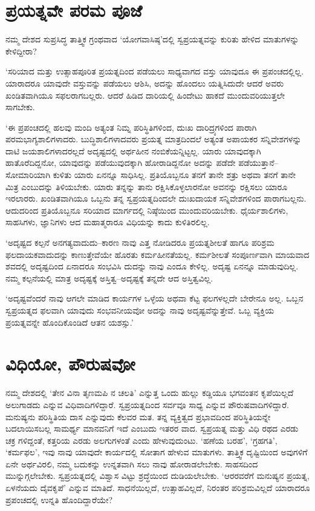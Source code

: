 \section*{ಪ್ರಯತ್ನವೇ ಪರಮ ಪೂಜೆ}


ನಮ್ಮ ದೇಶದ ಸುಪ್ರಸಿದ್ಧ ತಾತ್ತ್ವಿಕ ಗ್ರಂಥವಾದ ‘ಯೋಗವಾಸಿಷ್ಠ’ದಲ್ಲಿ ಸ್ವಪ್ರಯತ್ನವನ್ನು ಕುರಿತು ಹೇಳಿದ ಮಾತುಗಳನ್ನು ಕೇಳಿದ್ದೀರಾ?

‘ಸರಿಯಾದ ಮತ್ತು ಉತ್ಸಾಹಪೂರಿತ ಪ್ರಯತ್ನದಿಂದ ಪಡೆಯಲು ಸಾಧ್ಯವಾಗದ ವಸ್ತು ಯಾವುದೂ ಈ ಪ್ರಪಂಚದಲ್ಲಿಲ್ಲ. ಯಾರಾದರೂ ಯಾವುದೇ ವಸ್ತುವನ್ನು ಪಡೆಯಲು ಆಶಿಸಿ, ಅದನ್ನು ಹೊಂದಲು ಯತ್ನಿಸಿದುದೇ ಆದರೆ ಅವರು ಖಂಡಿತವಾಗಿಯೂ ಸಫಲರಾಗಬಲ್ಲರು. ಆದರೆ ಹಿಡಿದ ದಾರಿಯಲ್ಲಿ ಹಿಂದೇಟು ಹಾಕದೆ ಮುಂದುವರಿಯುತ್ತಲೇ ಸಾಗಬೇಕು.

\newpage

‘ಈ ಪ್ರಪಂಚದಲ್ಲಿ ಹಲವು ಮಂದಿ ಅತ್ಯಂತ ನಿಮ್ನ ಪರಿಸ್ಥಿತಿಗಳಿಂದ, ದುಃಖ ದಾರಿದ್ರ್ಯ\-ಗಳಿಂದ ಪಾರಾಗಿ ಪರಮಭಾಗ್ಯಶಾಲಿಗಳಾದರು. ಬುದ್ಧಿಶಾಲಿಗಳಾದವರು ಪ್ರಯತ್ನ ಮಾತ್ರದಿಂದಲೆ ಅತ್ಯಂತ ಅಪಾಯಕರ ಸನ್ನಿವೇಶಗಳನ್ನು ದಾಟಿ ಜಯಶಾಲಿಗಳಾದರಲ್ಲದೆ ಅದೃಷ್ಟದಲ್ಲಿ ಅರ್ಥಹೀನ ನಂಬಿಕೆಯನ್ನಿಟ್ಟಲ್ಲ. ಯಾರು ಯಾವುದಕ್ಕಾಗಿ ಹಾತೊರೆದಿದ್ದನೋ, ಯಾವುದನ್ನು ಪಡೆಯುವುದಕ್ಕಾಗಿ ಹೋರಾಡಿದ್ದನೋ ಅದನ್ನು ಪಡೆದೇ ಪಡೆಯುತ್ತಾನೆ–ಸೋಮಾರಿಯಾಗಿ ಕುಳಿತು ಯಾರು ಏನನ್ನೂ ಸಾಧಿಸಿಲ್ಲ. ಪ್ರತಿಯೊಬ್ಬನೂ ತನಗೆ ತಾನೇ ಶತ್ರು ಅಥವಾ ತನಗೆ ತಾನೇ ಮಿತ್ರ ಎಂಬುದನ್ನು ತಿಳಿಯಬೇಕು. ಯಾರು ತನ್ನನ್ನು ತಾನು ರಕ್ಷಿಸಿಕೊಳ್ಳಲಾರನೋ ಅವನನ್ನು ರಕ್ಷಿಸಲು ಯಾರೂ ಇರಲಾರರು. ಖಂಡಿತವಾಗಿಯೂ ಒಬ್ಬನು ತನ್ನ ಸ್ವಪ್ರಯತ್ನದಿಂದಲೇ ದುಃಖದಾಯಕ ಸನ್ನಿವೇಶಗಳಿಂದ ಪಾರಾಗಬಲ್ಲನು. ಆದುದರಿಂದ ಪ್ರತಿಯೊಬ್ಬನೂ ಸರಿಯಾದ ಮಾರ್ಗದಲ್ಲಿ ನಿಷ್ಠೆಯಿಂದ ಮುಂದುವರಿಯಬೇಕು. ಧೈರ್ಯಶಾಲಿಗಳು, ಸಾಹಸಿಗಳು, ಜ್ಞಾನಿಗಳು ಆದ ಮಹಾತ್ಮರಾರೂ ವಿಧಿಯನ್ನು ಕಾದು ಕುಳಿತಿರಲಿಲ್ಲ.

‘ಅದೃಷ್ಟದ ಕಲ್ಪನೆ ಅನಗತ್ಯವಾದುದು–ಕಾರಣ ನಾವು ಎತ್ತ ನೋಡಿದರೂ ಪ್ರಯತ್ನಶೀಲತೆ ಹಾಗೂ ಪರಿಶ್ರಮ ಫಲದಾಯಕವಾದುದನ್ನು ಕಾಣುತ್ತೇವೆಯೇ ಹೊರತು ಕರ್ಮಹೀನತೆಯಲ್ಲ. ಕರ್ಮಶೀಲತೆ ಸಂಪೂರ್ಣವಾಗಿ ಮಾಯವಾದ ಶವದಲ್ಲಿ ಅದೃಷ್ಟದಿಂದ ಏನಾದರೂ ಸಂಭವಿಸಿ ದುದನ್ನು ನಾವು ಎಂದೂ ಕೇಳಿಲ್ಲ. ಅದೃಷ್ಟ ಏನನ್ನೂ ಮಾಡುವುದಿಲ್ಲ. ನಮ್ಮ ಕಲ್ಪನೆಯಲ್ಲಿ ಮಾತ್ರ ಅದೃಷ್ಟಕ್ಕೆ ಅಸ್ತಿತ್ವ–ಅದೃಷ್ಟಕ್ಕೆ ತನ್ನದೇ ಆದ ಅಸ್ತಿತ್ವವಿಲ್ಲ.

‘ಅದೃಷ್ಟವೆಂದರೆ ನಾವು ಆಗಲೇ ಮಾಡಿದ ಕಾರ್ಯಗಳ ಒಳ್ಳೆಯ ಅಥವಾ ಕೆಟ್ಟ ಫಲಗಳಲ್ಲದೇ ಬೇರೇನೂ ಅಲ್ಲ. ಒಬ್ಬನ ಸ್ವಪ್ರಯತ್ನದ ಫಲವಾಗಿ ಯಾವುದು ಸಂಭವನೀಯವೋ ಅದನ್ನು ನಾವು ಅದೃಷ್ಟವೆನ್ನುತ್ತೇವೆ. ಒಬ್ಬ ವ್ಯಕ್ತಿಯ ಪ್ರಯತ್ನವನ್ನೇ ಹೊಂದಿಕೊಂಡಿದೆ ಆತನ ಯಶಸ್ಸು.’


\section*{ವಿಧಿಯೋ, ಪೌರುಷವೋ}


ನಮ್ಮ ದೇಶದಲ್ಲಿ ‘ತೇನ ವಿನಾ ತೃಣಮಪಿ ನ ಚಲತಿ’ ಎನ್ನುತ್ತ ಒಂದು ಹುಲ್ಲು ಕಡ್ಡಿಯೂ ಭಗವಂತನ ಕೃಪೆಯಿಲ್ಲದೆ ಅಲುಗಾಡದು ಎನ್ನುವ ವಿಧಿವಾದಿಗಳಿದ್ದಾರೆ. ಸ್ವಪ್ರಯತ್ನದಿಂದ ಸರ್ವವೂ ಸಾಧ್ಯ ಎನ್ನುವ ಪೌರುಷವಾದಿಗಳಿದ್ದಾರೆ. ಮನುಷ್ಯನು ಪರಿಸ್ಥಿತಿಯ ದಾಸ ಎನ್ನುವುದು ಕೆಲವರ ಮತ. ತನ್ನ ವ್ಯಕ್ತಿತ್ವದ ಪ್ರಭಾವದಿಂದ ಪರಿಸ್ಥಿತಿಯನ್ನೇ ಬದಲಾಯಿಸಬಲ್ಲ ಸಾಮರ್ಥ್ಯ ಮಾನವನಿಗೆ ಇದೆ ಎಂಬುದು ಇತರರ ವಾದ. ಸ್ವಪ್ರಯತ್ನ ಮತ್ತು ವಿಧಿ ರಥದ ಎರಡು ಚಕ್ರ ಗಳಿದ್ದಂತೆ, ಕತ್ತರಿಯ ಎರಡು ಅಲಗುಗಳಂತೆ ಎಂದು ಹೇಳುವುದುಂಟು. ‘ಹಣೆಯ ಬರಹ’, ‘ಗ್ರಹಗತಿ’, ‘ಕರ್ಮಫಲ’, ಇವು ನಾವು ಯಾವುದೇ ಕಾರ್ಯದಲ್ಲಿ ಸೋತಾಗ ಹೇಳುವ ಮಾತುಗಳು. ತಾತ್ತ್ವಿಕ ದೃಷ್ಟಿಯಿಂದ ಅವುಗಳಿಗೆ ಏನೇ ಅರ್ಥವಿರಲಿ, ನಮ್ಮ ಬದುಕನ್ನು ಉನ್ನತವಾಗಿ ಸಲು ನಾವು ಹೋರಾಡಲೇಬೇಕು. ಸಾಹಸದಿಂದ ಮುನ್ನುಗ್ಗಲೇಬೇಕು. ಸ್ವಪ್ರಯತ್ನದಲ್ಲಿ ವಿಶ್ವಾಸ ವಿಟ್ಟು ಶ್ರದ್ಧೆಯಿಂದ ದುಡಿಯಲೇಬೇಕು. ‘ಆರರವರೆಗೆ ಮನುಷ್ಯನ ಪ್ರಯತ್ನ, ಏಳನೆಯದು ದೈವಕೃಪೆ’ ಎನ್ನುವ ಮಾತಿದೆ. ಸಾಧನೆಯಿಲ್ಲದೆ, ಉತ್ಸಾಹವಿಲ್ಲದೆ, ನಿರಂತರ ಪರಿಶ್ರಮವಿಲ್ಲದೆ ಯಾರಾದರೂ ಪ್ರಪಂಚದಲ್ಲಿ ಉನ್ನತಿ ಹೊಂದಿದ್ದಾರೆಯೇ?

